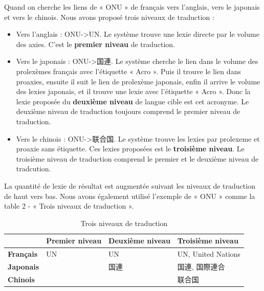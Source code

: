 \documentclass[10pt,a4paper,twoside]{article}
\begin{document}
\begin{itemize}
Quand on cherche les liens de « ONU » de français vers l’anglais,  vers le japonais et vers le chinois. Nous avons proposé trois niveaux de traduction :\\

\begin{itemize}
\begin{itemize}
\item Vers l’anglais : ONU->UN. Le système trouve une lexie directe par le volume des axies. C’est le \textbf{premier niveau} de traduction.
\item Vers le japonais : ONU->国連. Le système cherche le lien dans le volume des prolexèmes français avec l’étiquette « Acro ». Puis il trouve le lien dans proaxies, ensuite il suit le lien de prolexème japonais, enfin il arrive le volume des lexies japonais, et il trouve une lexie avec l’étiquette « Acro ». Donc la lexie proposée du \textbf{deuxième niveau} de langue cible est cet acronyme.  Le deuxième niveau de traduction toujours comprend le premier niveau de traduction.
\item Vers le chinois : ONU->联合国.  Le système trouve les lexies par prolexeme et proaxie sans étiquette. Ces lexies proposées est le \textbf{troisième niveau}. Le troisième niveau de traduction comprend le premier et le deuxième niveau de tradcution.
\end{itemize}
\end{itemize}
La quantité de lexie de résultat est augmentée suivant les niveaux de traduction de haut vers bas. Nous avons également utilisé l’exemple de « ONU » comme la table 2 - « Trois niveaux de traduction ».\\

\begin{table}[!h]
\centering
	\begin{tabular}{|l|l|l|l|}
	\hline
	\textbf{} & \textbf{Premier niveau} & \textbf{Deuxième niveau} & \textbf{Troisième niveau} \\
	\hline
	\textbf{Français} & UN & UN & UN, United Nations \\
 	\hline
	\textbf{Japonais} &  & 国連 &国連, 国際連合 \\
	\hline
	\textbf{Chinois} & & &联合国  \\
	\hline
	\end{tabular}
\caption{ Trois niveaux de traduction }\label{table}
\end{table}




\end{itemize}
\end{document}
